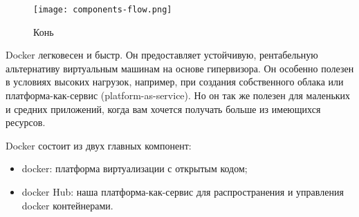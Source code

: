 \begin{figure}[h!]
\centering
	\texttt{[image: components-flow.png]}
	\caption{Конь}
\end{figure}
\clearpage

Docker легковесен и быстр. Он предоставляет устойчивую, рентабельную альтернативу виртуальным машинам на основе гипервизора. Он особенно полезен в условиях высоких нагрузок, например, при создания собственного облака или платформа-как-сервис (platform-as-service). Но он так же полезен для маленьких и средних приложений, когда вам хочется получать больше из имеющихся ресурсов.

Docker состоит из двух главных компонент:

\begin{itemize}
  \item docker: платформа виртуализации с открытым кодом;
  \item docker Hub: наша платформа-как-сервис для распространения и управления docker контейнерами.
\end{itemize}
